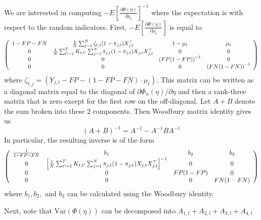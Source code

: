 \documentclass[12pt]{amsart}
\numberwithin{equation}{section}
\theoremstyle{plain}
\begin{document}
We are interested in computing $- E \left[ \frac{\partial \Phi (\eta)}{\partial \mu_t} \right]^{-1}$ where the expectation is with respect to the random indicators. First, $- E \left[ \frac{\partial \Phi (\eta)}{\partial \mu_t} \right]$ is equal to
$$
\left (
\begin{array}{c c c c}
1-FP-FN & \frac{1}{N} \sum_{j=1}^N \zeta_{t,j} (1-\pi_{j,t}) X_{j,t}^\top & 1 - \mu_t & \mu_t \\
0 & \frac{1}{N} \sum_{t^\prime=1}^T K_{t,t^\prime} \sum_{j=1}^N \pi_{j,t} (1-\pi_{j,t}) X_{j,t} X_{j,t}^\top & 0 & 0\\
0 & 0 & \left( FP (1-FP) \right)^{-1}  & 0\\
0 & 0 & 0 & \left( FN (1-FN) \right)^{-1}
\end{array}
\right )
$$
where $\zeta_{t,j} = (Y_{j,t} - FP - (1-FP-FN) \cdot \mu_t)$. This matrix can be written as a diagonal matrix equal to the diagonal of $\partial \Phi_n (\eta)/\partial \eta$ and then a rank-three matrix that is zero except for the first row on the off-diagonal. Let $A + B$ denote the sum broken into these 2 components.  Then Woodbury matrix identity gives us
$$
(A+B)^{-1} = A^{-1} - A^{-1} B A^{-1}
$$
In particular, the resulting inverse is of the form
$$
\left (
\begin{array}{c c c c}
\frac{1}{1-FP-FN} & b_1 & b_2  & b_3 \\
0 & \left[\frac{1}{N} \sum_{t^\prime=1}^T K_{t,t^\prime} \sum_{j=1}^N \pi_{j,t} (1-\pi_{j,t}) X_{j,t} X_{j,t}^\top\right]^{-1} & 0 & 0\\
0 & 0 & FP (1-FP)   & 0\\
0 & 0 & 0 & FN (1-FN)
\end{array}
\right)
$$
where $b_1, b_2,$ and $b_3$ can be calculated using the Woodbury identity.

Next, note that $\text{Var}(\Phi(\eta))$ can be decomposed into $A_{1,t} + A_{2,t} + A_{3,t} + A_{4,t}$
\end{document}
